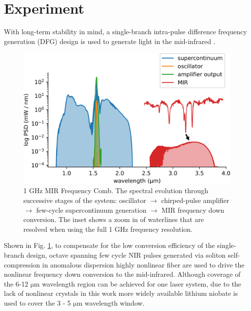 \documentclass{optica-article}
\begin{document}


\section{Experiment}


With long-term stability in mind, a single-branch intra-pulse difference frequency generation (DFG) design is used to generate light in the mid-infrared \cite{hoghooghiBroadband1GHzMidinfrared2022}. 
% 
\begin{figure}[h]
    \centering
    \includegraphics[width=\linewidth]{spectrum_in_setup.png}
    \caption{1 GHz MIR Frequency Comb. The spectral evolution through successive stages of the system: oscillator $\rightarrow$ chirped-pulse amplifier $\rightarrow$ few-cycle supercontinuum generation $\rightarrow$ MIR frequency down conversion. The inset shows a zoom in of waterlines that are resolved when using the full 1 GHz frequency resolution.}
    \label{fig:spectrum_in_setup}
\end{figure}
%
Shown in Fig. \ref{fig:spectrum_in_setup}, to compensate for the low conversion efficiency of the single-branch design, octave spanning few cycle NIR pulses generated via soliton self-compression in anomalous dispersion highly nonlinear fiber are used to drive the nonlinear frequency down conversion to the mid-infrared. Although coverage of the 6-12 $\mathrm{\mu m}$ wavelength region can be achieved for one laser system, due to the lack of nonlinear crystals in this work more widely available lithium niobate is used to cover the 3 - 5 $\mathrm{\mu m}$ wavelength window.
\end{document}
